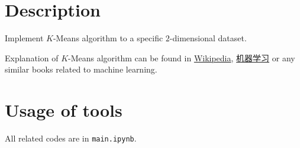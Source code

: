 \documentclass[english, nochinese]{../../TeXTemplate/pkupaper}
\title{\titlemark}
\author{pppppass}
\date{February 24, 2018}
\begin{document}
\maketitle

\section{Description}

Implement $K$-Means algorithm to a specific $2$-dimensional dataset.

Explanation of $K$-Means algorithm can be found in \href{https://en.wikipedia.org/wiki/K-means_clustering}{Wikipedia}, \href{https://item.jd.com/11867803.html}{机器学习} or any similar books related to machine learning.

\section{Usage of tools}

All related codes are in \verb"main.ipynb".
\end{document}
